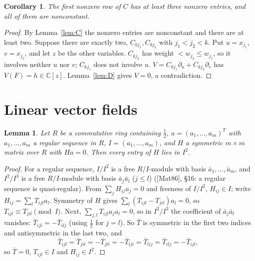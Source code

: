 \documentclass[11pt]{article}
\newcommand{\C}{\mathbb{C}}
\newtheorem{lemma}[theorem]{Lemma}
\newtheorem{corollary}[theorem]{Corollary}
\theoremstyle{remark}
\begin{document}
\begin{corollary}\label{cor:three}
The first nonzero row of $C$ has at least three nonzero entries, and all of them are nonconstant.
\end{corollary}

\begin{proof}
By Lemma~\ref{lem:C} the nonzero entries are nonconstant and there are at least two. Suppose there are exactly two, $C_{kj_1},C_{kj_2}$ with $j_1<j_2<k$. Put $u=x_{j_1}$, $v=x_{j_2}$, and let $z$ be the other variables. $C_{kj_2}$ has weight $<w_{j_2}\le w_{j_1}$, so it involves neither $u$ nor $v$; $C_{kj_1}$ does not involve $u$. $V=C_{kj_1}\partial_u+C_{kj_2}\partial_v$ has $V(F)=h\in\C[z]$. Lemma~\ref{lem:D} gives $V=0$, a contradiction.
\end{proof}

\section{Linear vector fields}

\begin{lemma}\label{lem:G}
Let $R$ be a commutative ring containing $\tfrac12$, $a=(a_1,\dots,a_m)^T$ with $a_1,\dots,a_m$ a regular sequence in $R$, $I=(a_1,\dots,a_m)$, and $H$ a symmetric $m\times m$ matrix over $R$ with $Ha=0$. Then every entry of $H$ lies in $I^2$.
\end{lemma}

\begin{proof}
For a regular sequence, $I/I^2$ is a free $R/I$-module with basis $\bar a_1,\dots,\bar a_m$, and $I^2/I^3$ is a free $R/I$-module with basis $\bar a_j\bar a_l$ ($j\le l$) ([Mat86], \S16: a regular sequence is quasi-regular). From $\sum_jH_{ij}a_j=0$ and freeness of $I/I^2$, $H_{ij}\in I$; write $H_{ij}=\sum_lT_{ijl}a_l$. Symmetry of $H$ gives $\sum_l(T_{ijl}-T_{jil})a_l=0$, so $T_{ijl}\equiv T_{jil}\pmod I$. Next, $\sum_{j,l}T_{ijl}a_ja_l=0$, so in $I^2/I^3$ the coefficient of $\bar a_j\bar a_l$ vanishes: $\bar T_{ijl}=-\bar T_{ilj}$ (using $\tfrac12$ for $j=l$). So $\bar T$ is symmetric in the first two indices and antisymmetric in the last two, and
\[
\bar T_{ijl}=\bar T_{jil}=-\bar T_{jli}=-\bar T_{lji}=\bar T_{lij}=\bar T_{ilj}=-\bar T_{ijl},
\]
so $\bar T=0$, $T_{ijl}\in I$ and $H_{ij}\in I^2$.
\end{proof}
\end{document}
